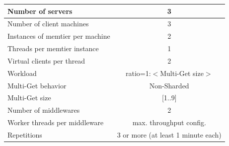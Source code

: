 \documentclass[11pt,a4paper]{article}
\begin{document}
\begin{center}
	\scriptsize{
		\begin{tabular}{|l|c|}
			\hline Number of servers                & 3                       \\ 
			\hline Number of client machines        & 3                       \\ 
			\hline Instances of memtier per machine & 2                       \\ 
			\hline Threads per memtier instance     & 1                       \\
			\hline Virtual clients per thread       & 2                		 \\ 
			\hline Workload                         & ratio=1:$<$Multi-Get size$>$              \\
			\hline Multi-Get behavior               & Non-Sharded             \\
			\hline Multi-Get size                   & [1..9]                  \\
			\hline Number of middlewares            & 2                       \\
			\hline Worker threads per middleware    & max. throughput config. \\
			\hline Repetitions                      & 3 or more (at least 1 minute each)               \\ 
			\hline 
		\end{tabular}
	} 
\end{center}
\end{document}
